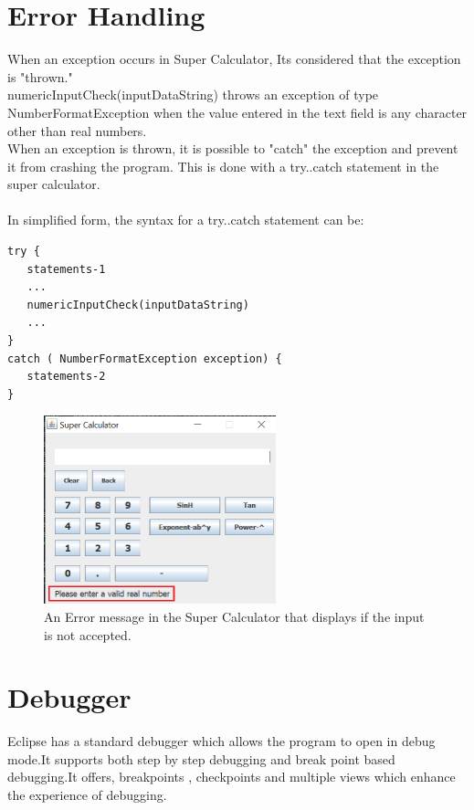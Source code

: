 \documentclass[a4paper, 11pt]{report}
\begin{document}
\section*{Error Handling}
When an exception occurs in Super Calculator, Its considered that the exception is "thrown."
\newline\\
numericInputCheck(inputDataString)  throws an exception of type NumberFormatException when the value entered in the text field is any character other than real numbers. \newline\\
When an exception is thrown, it is possible to "catch" the exception and prevent it from crashing the program. This is done with a try..catch statement in the super calculator. 
\newline\\\\
In simplified form, the syntax for a try..catch statement can be:
\\
\begin{lstlisting}
try {
   statements-1
   ...
   numericInputCheck(inputDataString)
   ...
}
catch ( NumberFormatException exception) {
   statements-2
}
\end{lstlisting}
\begin{figure}
\includegraphics[width=0.6\textwidth]{error_handling_F7}
\centering
\caption{ An Error message in the Super Calculator that displays if the input is not accepted.
}
\end{figure}
\newpage
\section*{Debugger}
Eclipse has a standard debugger which allows the program to open in debug mode.It supports both step by step debugging and break point based debugging.It offers, breakpoints , checkpoints and multiple views which enhance the experience of debugging.\\
\end{document}

